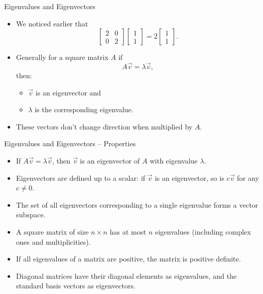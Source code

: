 \documentclass{beamer}
\begin{document}
\begin{frame}{Eigenvalues and Eigenvectors}
  \begin{itemize}
    \item We noticed earlier that 
    \begin{equation}
        \begin{bmatrix} 2 & 0 \\ 0 & 2 \end{bmatrix}\begin{bmatrix} 1 \\ 1 \end{bmatrix} = 2\begin{bmatrix} 1 \\ 1 \end{bmatrix}. 
    \end{equation}
    \item Generally for a square matrix \(A\) if
    \begin{equation}
        A\vec{v} = \lambda \vec{v},
    \end{equation}
    then:
    \begin{itemize}
      \item $\vec{v}$ is an eigenvector and
      \item $\lambda$ is the corresponding eigenvalue.
    \end{itemize}
    \item These vectors don't change direction when multiplied by $A$.
  \end{itemize}
\end{frame}

\begin{frame}{Eigenvalues and Eigenvectors – Properties}
  \begin{itemize}
    \item If $A \vec{v} = \lambda \vec{v}$, then $\vec{v}$ is an eigenvector of $A$ with eigenvalue $\lambda$.
    \item Eigenvectors are defined up to a scalar: if $\vec{v}$ is an eigenvector, so is $c\vec{v}$ for any $c \neq 0$.
    \item The set of all eigenvectors corresponding to a single eigenvalue forms a vector subspace.
    \item A square matrix of size $n \times n$ has at most $n$ eigenvalues (including complex ones and multiplicities).
    \item If all eigenvalues of a matrix are positive, the matrix is positive definite.
    \item Diagonal matrices have their diagonal elements as eigenvalues, and the standard basis vectors as eigenvectors.
  \end{itemize}
\end{frame}
\end{document}
